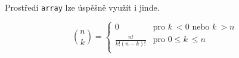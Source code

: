 \documentclass[11pt, a4paper, twocolumn]{article}
\theoremstyle{definition}
\theoremstyle{remark}
\theoremstyle{plain}
\begin{document}
Prostředí \verb|array| lze úspěšně využít i jinde.

$$
\binom{n}{k} =
\left\{
	\begin{array}{ll}
	0 & \text{pro } k~< 0 \text{ nebo } k~> n \\
	\frac{n!}{k!(n - k)!}  & \text{pro } 0 \leq k~\leq n\\
\end{array} \right.
$$




\end{document}
